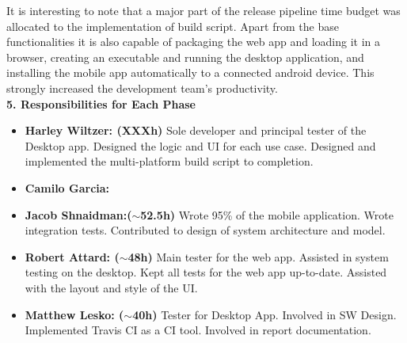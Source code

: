\documentclass[12pt]{article}
\begin{document}
It is interesting to note that a major part of the release pipeline time budget was allocated to the
implementation of build script. Apart from the base functionalities it is also capable of packaging
the web app and loading it in a browser, creating an executable and running the desktop application,
and installing the mobile app automatically to a connected android device. This strongly increased
the development team's productivity.\\

\textbf{5. Responsibilities for Each Phase}
\begin{itemize}
    \item \textbf{Harley Wiltzer: (XXXh)} Sole developer and principal tester of the Desktop app. Designed the logic and UI for each use case. Designed and implemented the multi-platform build script to completion.
    \item \textbf{Camilo Garcia: }
    \item \textbf{Jacob Shnaidman:($\sim$52.5h)} Wrote 95\% of the mobile application. Wrote integration tests. Contributed to design of system architecture and model. 
    \item \textbf{Robert Attard: ($\sim$48h)}
    Main tester for the web app. Assisted in system testing on the desktop. Kept all tests for the web app up-to-date. Assisted with the layout and style of the UI.
    \item \textbf{Matthew Lesko: ($\sim$40h)} Tester for Desktop App. Involved in SW Design. Implemented Travis CI as a CI tool. Involved in report documentation.
\end{itemize}
\end{document}
